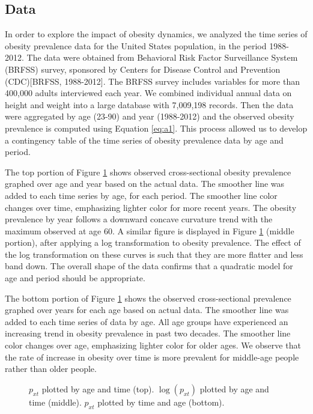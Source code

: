 \documentclass[11pt,letterpaper]{article}
\numberwithin{equation}{section}
\begin{document}
\subsection{Data}
In order to explore the impact of obesity dynamics, we analyzed the time series of obesity prevalence data for the United States population, in the  period 1988-2012. The data were obtained from Behavioral Risk Factor Surveillance System (BRFSS) survey, sponsored by Centers for Disease Control and Prevention (CDC)[BRFSS, 1988-2012]. The BRFSS survey includes variables for more than 400,000 adults interviewed each year. We combined individual annual data on height and weight into a large database with 7,009,198 records. Then the data were aggregated by age (23-90) and year (1988-2012) and the observed obesity prevalence is computed using Equation \ref{eq:a1}. This process allowed us to develop a contingency table of the time series of obesity prevalence data by age and period.

The top portion of Figure \ref{fig:plot1} shows observed cross-sectional obesity prevalence graphed over age and year based on the actual data. The smoother line was added to each time series by age, for each period. The smoother line color changes over time, emphasizing lighter color for more recent years. The obesity prevalence by year follows a downward concave curvature trend with the maximum observed at age 60. A similar figure is displayed in Figure \ref{fig:plot1} (middle portion), after applying a log transformation to obesity prevalence. The effect of the log transformation on these curves is such that they are more flatter and less band down. The overall shape of the data confirms that a quadratic model for age and period should be appropriate.

The bottom portion of Figure \ref{fig:plot1} shows the observed cross-sectional prevalence graphed over years for each age based on actual data. The smoother line was added to each time series of data by age. All age groups have experienced an increasing trend in obesity prevalence in past two decades. The smoother line color changes over age, emphasizing lighter color for older ages. We observe that the rate of increase in obesity over time is more prevalent for middle-age people rather than older people.

\begin{figure}
\begin{center}
{}
{}
{}
\caption{\label{fig:plot1} $p_{xt}$ plotted by age and time (top). $\log(p_{xt})$ plotted by age and time (middle). $p_{xt}$ plotted by time and age (bottom).}
\end{center}
\end{figure}
\end{document}
